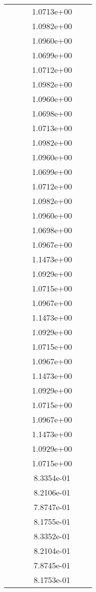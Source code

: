 \begin{xltabular}{\textwidth}{r|rS[table-format=1.3e+2]S[table-format=1.4e+2]S[table-format=1.4e+2]S[table-format=-1.5]}
&  &  & 1.0713e+00 & & \\
&  &  & 1.0982e+00 & & \\
&  &  & 1.0960e+00 & & \\
&  &  & 1.0699e+00 & & \\
&  &  & 1.0712e+00 & & \\
&  &  & 1.0982e+00 & & \\
&  &  & 1.0960e+00 & & \\
&  &  & 1.0698e+00 & & \\
&  &  & 1.0713e+00 & & \\
&  &  & 1.0982e+00 & & \\
&  &  & 1.0960e+00 & & \\
&  &  & 1.0699e+00 & & \\
&  &  & 1.0712e+00 & & \\
&  &  & 1.0982e+00 & & \\
&  &  & 1.0960e+00 & & \\
&  &  & 1.0698e+00 & & \\
&  &  & 1.0967e+00 & & \\
&  &  & 1.1473e+00 & & \\
&  &  & 1.0929e+00 & & \\
&  &  & 1.0715e+00 & & \\
&  &  & 1.0967e+00 & & \\
&  &  & 1.1473e+00 & & \\
&  &  & 1.0929e+00 & & \\
&  &  & 1.0715e+00 & & \\
&  &  & 1.0967e+00 & & \\
&  &  & 1.1473e+00 & & \\
&  &  & 1.0929e+00 & & \\
&  &  & 1.0715e+00 & & \\
&  &  & 1.0967e+00 & & \\
&  &  & 1.1473e+00 & & \\
&  &  & 1.0929e+00 & & \\
&  &  & 1.0715e+00 & & \\
&  &  & 8.3354e-01 & & \\
&  &  & 8.2106e-01 & & \\
&  &  & 7.8747e-01 & & \\
&  &  & 8.1755e-01 & & \\
&  &  & 8.3352e-01 & & \\
&  &  & 8.2104e-01 & & \\
&  &  & 7.8745e-01 & & \\
&  &  & 8.1753e-01 & & \\

\end{xltabular}
